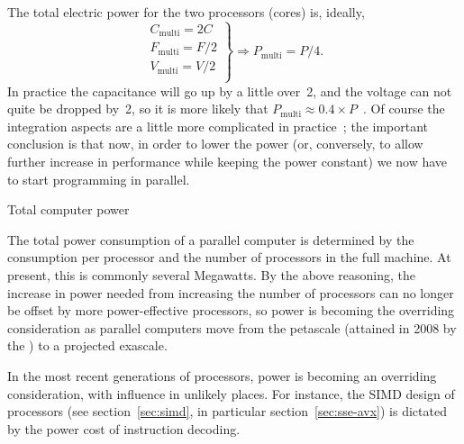 The total electric power for the two processors (cores) is, ideally,
\[ \left.
\begin{array}{c}
C_{\mathrm{multi}} = 2C\\
F_{\mathrm{multi}} = F/2\\
V_{\mathrm{multi}} = V/2\\
\end{array}\right\} \Rightarrow
P_{\mathrm{multi}} = P/4.
\]
In practice the capacitance will go up by a little over~2, and the
voltage can not quite be dropped by~2, so it is more likely that
$P_{\mathrm{multi}} \approx 0.4\times
P$~\cite{Chandrakasa:transformations}.  Of course the integration
aspects are a little more complicated in
practice~\cite{Bohr:ISSCC2009}; the important conclusion is that now,
in order to lower the power (or, conversely, to allow further increase
in performance while keeping the power constant) we now have to start
programming in parallel.

 {Total computer power}

The total power consumption of a parallel computer is determined by
the consumption per processor and the number of processors in the full
machine. At present, this is commonly several Megawatts. By the above
reasoning, the increase in power needed from increasing the number of
processors can no longer be offset by more power-effective processors,
so power is becoming the overriding consideration as parallel
computers move from the petascale (attained in 2008 by the
) to a projected exascale.

In the most recent generations of processors, power is becoming an
overriding consideration, with influence in unlikely places. For
instance, the \ac{SIMD} design of processors (see
section~\ref{sec:simd}, in particular section~\ref{sec:sse-avx}) is
dictated by the power cost of instruction decoding.
